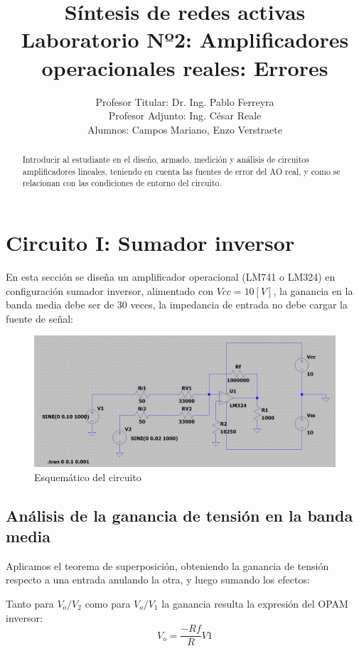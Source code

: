 \documentclass[12pt]{article}
\title{Síntesis de redes activas \\ Laboratorio Nº2: Amplificadores operacionales reales: Errores}
\author{Profesor Titular: Dr. Ing. Pablo Ferreyra \\  Profesor Adjunto: Ing. César Reale \\ Alumnos: Campos Mariano, 
	Enzo Verstraete}
\begin{document}
	\maketitle
	
	\begin{abstract}
		Introducir al estudiante en el diseño, armado, medición y análisis de circuitos amplificadores
		lineales, teniendo en cuenta las fuentes de error del AO real, y como se relacionan con las
		condiciones de entorno del circuito.
	\end{abstract}
	
	\section{Circuito I: Sumador inversor}
		En esta sección se diseña un amplificador operacional (LM741 o LM324) en configuración sumador inversor, alimentado con $Vcc=10[V]$, la ganancia en la banda media debe ser de 30 veces, la impedancia de entrada no debe cargar la fuente de señal:
		
	\begin{figure}[]
		\includegraphics[width=\linewidth]{Imagenes_simulaciones/Esquematico_Circ1}
		\caption[Esquemático del circuito]{Esquemático del circuito}
		\label{fig:esquematicocirc1}
	\end{figure}
	
	\subsection{Análisis de la ganancia de tensión en la banda media}
	Aplicamos el teorema de superposición, obteniendo la ganancia de tensión respecto a una entrada anulando la otra, y luego sumando los efectos:
	
	Tanto para $V_{o}/V_{2}$ como para $V_{o}/V_{1}$ la ganancia resulta la expresión del OPAM inversor:
	\begin{equation}
		V_{o}= \frac{-Rf}{R}V1
	\end{equation}
\end{document}
